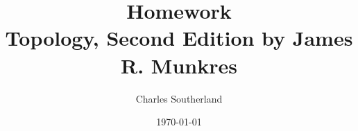 \documentclass{book}
\title{Homework\\Topology, Second Edition by James R. Munkres}
\author{Charles Southerland}
\date{\today}
\begin{document}
\maketitle{}

\tableofcontents{}




\part*{}
\todos{}
\end{document}
